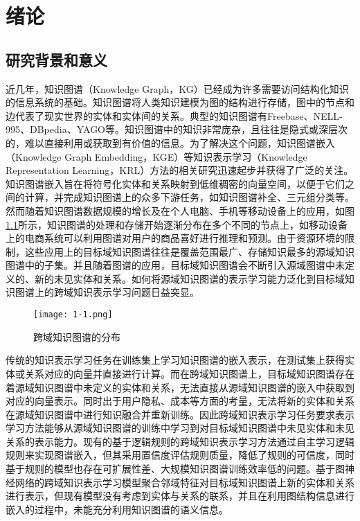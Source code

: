 \chapter{绪论}

\section{研究背景和意义}
近几年，知识图谱（Knowledge Graph，KG）已经成为许多需要访问结构化知识的信息系统的基础\cite{zou2020survey}。知识图谱将人类知识建模为图的结构进行存储，图中的节点和边代表了现实世界的实体和实体间的关系。典型的知识图谱有Freebase\cite{bollacker2008freebase}、NELL-995\cite{xiong2017deeppath}、DBpedia\cite{bizer2009dbpedia}、YAGO\cite{suchanek2007yago}等。知识图谱中的知识非常庞杂，且往往是隐式或深层次的，难以直接利用或获取到有价值的信息。为了解决这个问题，知识图谱嵌入（Knowledge Graph Embedding，KGE）等知识表示学习（Knowledge Representation Learning，KRL）方法的相关研究迅速起步并获得了广泛的关注。知识图谱嵌入旨在将符号化实体和关系映射到低维稠密的向量空间，以便于它们之间的计算\cite{2021-eh}，并完成知识图谱上的众多下游任务，如知识图谱补全、三元组分类等。然而随着知识图谱数据规模的增长及在个人电脑、手机等移动设备上的应用，如图\ref{fig:1-1}所示，知识图谱的处理和存储开始逐渐分布在多个不同的节点上，如移动设备上的电商系统可以利用图谱对用户的商品喜好进行推理和预测。由于资源环境的限制，这些应用上的目标域知识图谱往往是覆盖范围最广、存储知识最多的源域知识图谱中的子集。并且随着图谱的应用，目标域知识图谱会不断引入源域图谱中未定义的、新的未见实体和关系。如何将源域知识图谱的表示学习能力泛化到目标域知识图谱上的跨域知识表示学习问题日益突显。
\begin{figure}[h]
  \centering
  \texttt{[image: 1-1.png]}
  \caption{跨域知识图谱的分布}
  \label{fig:1-1}
\end{figure}

传统的知识表示学习任务在训练集上学习知识图谱的嵌入表示，在测试集上获得实体或关系对应的向量并直接进行计算。而在跨域知识图谱上，目标域知识图谱存在着源域知识图谱中未定义的实体和关系，无法直接从源域知识图谱的嵌入中获取到对应的向量表示。同时出于用户隐私、成本等方面的考量，无法将新的实体和关系在源域知识图谱中进行知识融合并重新训练。因此跨域知识表示学习任务要求表示学习方法能够从源域知识图谱的训练中学习到对目标域知识图谱中未见实体和未见关系的表示能力。现有的基于逻辑规则的跨域知识表示学习方法通过自主学习逻辑规则来实现图谱嵌入，但其采用置信度评估规则质量，降低了规则的可信度，同时基于规则的模型也存在可扩展性差、大规模知识图谱训练效率低的问题。基于图神经网络的跨域知识表示学习模型聚合邻域特征对目标域知识图谱上新的实体和关系进行表示，但现有模型没有考虑到实体与关系的联系，并且在利用图结构信息进行嵌入的过程中，未能充分利用知识图谱的语义信息。

